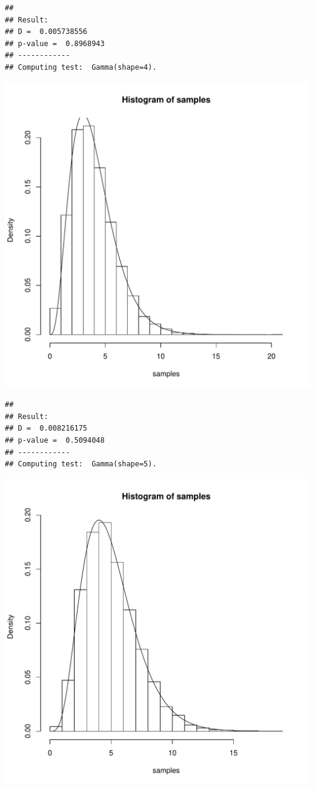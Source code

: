 \documentclass{llncs}\usepackage[]{graphicx}\usepackage[]{color}
\makeatletter
\def\maxwidth{ %
  \ifdim\Gin@nat@width>\linewidth
    \linewidth
  \else
    \Gin@nat@width
  \fi
}
\newenvironment{kframe}{%
 \def\at@end@of@kframe{}%
 \ifinner\ifhmode%
  \def\at@end@of@kframe{\end{minipage}}%
  \begin{minipage}{\columnwidth}%
 \fi\fi%
 \def\FrameCommand##1{\hskip\@totalleftmargin \hskip-\fboxsep
 \colorbox{shadecolor}{##1}\hskip-\fboxsep
     \hskip-\linewidth \hskip-\@totalleftmargin \hskip\columnwidth}%
 \MakeFramed {\advance\hsize-\width
   \@totalleftmargin\z@ \linewidth\hsize
   \@setminipage}}%
 {\par\unskip\endMakeFramed%
 \at@end@of@kframe}
\newenvironment{knitrout}{}{} %
\makeatother
\begin{document}
\begin{knitrout}
\begin{kframe}\begin{lstlisting}[basicstyle=\ttfamily,breaklines=true]
## 
## Result:
## D =  0.005738556 
## p-value =  0.8968943 
## ------------
## Computing test:  Gamma(shape=4).
\end{lstlisting}
\end{kframe}
\includegraphics[width=\maxwidth]{figure/Rt-12} 
\begin{kframe}\begin{lstlisting}[basicstyle=\ttfamily,breaklines=true]
## 
## Result:
## D =  0.008216175 
## p-value =  0.5094048 
## ------------
## Computing test:  Gamma(shape=5).
\end{lstlisting}
\end{kframe}
\includegraphics[width=\maxwidth]{figure/Rt-13} 

\end{knitrout}
\end{document}
